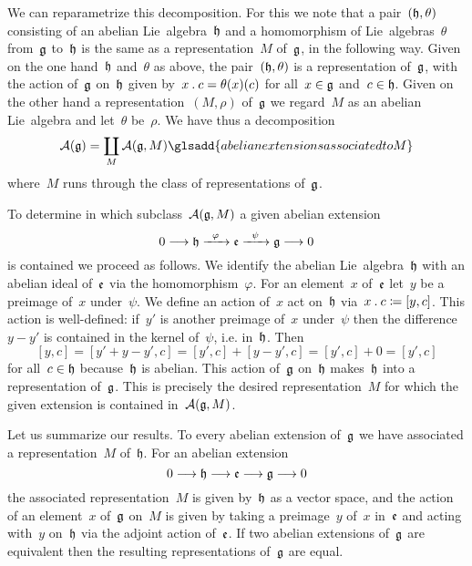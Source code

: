 \begin{fluff}
	We can reparametrize this decomposition.
	For this we note that a pair~$(\mathfrak{h}, \theta)$ consisting of an abelian Lie~algebra~$\mathfrak{h}$ and a homomorphism of Lie~algebras~$\theta$ from~$\mathfrak{g}$ to~$\mathfrak{h}$ is the same as a representation~$M$ of~$\mathfrak{g}$, in the following way.
	Given on the one hand~$\mathfrak{h}$ and~$\theta$ as above, the pair~$(\mathfrak{h}, \theta)$ is a representation of~$\mathfrak{g}$, with the action of~$\mathfrak{g}$ on~$\mathfrak{h}$ given by~$x \mathbin{.} c = \theta(x)(c)$ for all~$x \in \mathfrak{g}$ and~$c \in \mathfrak{h}$.
	Given on the other hand a representation~$(M, \rho)$ of~$\mathfrak{g}$ we regard~$M$ as an abelian Lie~algebra and let~$\theta$ be~$\rho$.
	We have thus a decomposition
	\[
		\AbEx(\glie)
		=
		\coprod_M \AbEx(\glie, M)
		\glsadd{abelian extensions associated to M}
	\]
	where~$M$ runs through the class of representations of~$\mathfrak{g}$.

	To determine in which subclass~$\mathcal{A}(\mathfrak{g}, M)$ a given abelian extension
	\[
		0
		\to
		\hlie
		\xto{\varphi}
		\elie
		\xto{\psi}
		\glie
		\to
		0
	\]
	is contained we proceed as follows.
	We identify the abelian Lie~algebra~$\mathfrak{h}$ with an abelian ideal of~$\mathfrak{e}$ via the homomorphism~$\varphi$.
	For an element~$x$ of~$\mathfrak{e}$ let~$y$ be a preimage of~$x$ under~$\psi$.
	We define an action of~$x$ act on~$\mathfrak{h}$ via~$x \mathbin{.} c \coloneqq [y, c]$.
	This action is well-defined:
	if~$y'$ is another preimage of~$x$ under~$\psi$ then the difference~$y - y'$ is contained in the kernel of~$\psi$, i.e. in~$\mathfrak{h}$.
	Then
	\[
		[y, c]
		=
		[y' + y - y', c]
		=
		[y', c] + [y - y', c]
		=
		[y', c] + 0
		=
		[y', c]
	\]
	for all~$c \in \mathfrak{h}$ because~$\mathfrak{h}$ is abelian.
	This action of~$\mathfrak{g}$ on~$\mathfrak{h}$ makes~$\mathfrak{h}$ into a representation of~$\mathfrak{g}$.
	This is precisely the desired representation~$M$ for which the given extension is contained in~$\mathcal{A}(\mathfrak{g}, M)$.

	Let us summarize our results.
	To every abelian extension of~$\mathfrak{g}$ we have associated a representation~$M$ of~$\mathfrak{h}$.
	For an abelian extension
	\[
		0
		\to
		\hlie
		\to
		\elie
		\to
		\glie
		\to
		0
	\]
	the associated representation~$M$ is given by~$\mathfrak{h}$ as a vector space, and the action of an element~$x$ of~$\mathfrak{g}$ on~$M$ is given by taking a preimage~$y$ of~$x$ in~$\mathfrak{e}$ and acting with~$y$ on~$\mathfrak{h}$ via the adjoint action of~$\mathfrak{e}$.
	If two abelian extensions of~$\mathfrak{g}$ are equivalent then the resulting representations of~$\mathfrak{g}$ are equal.
\end{fluff}


